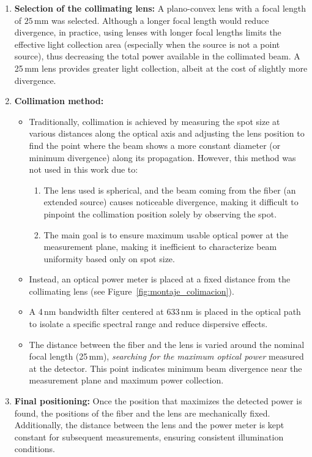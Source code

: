 \begin{enumerate}
    \item \textbf{Selection of the collimating lens:} A plano-convex lens with a focal length of $25$\,mm was selected. Although a longer focal length would reduce divergence, in practice, using lenses with longer focal lengths limits the effective light collection area (especially when the source is not a point source), thus decreasing the total power available in the collimated beam. A 25\,mm lens provides greater light collection, albeit at the cost of slightly more divergence.
    
    \item \textbf{Collimation method:}
    \begin{itemize}
        \item Traditionally, collimation is achieved by measuring the spot size at various distances along the optical axis and adjusting the lens position to find the point where the beam shows a more constant diameter (or minimum divergence) along its propagation. However, this method was not used in this work due to:
        \begin{enumerate}
            \item The lens used is spherical, and the beam coming from the fiber (an extended source) causes noticeable divergence, making it difficult to pinpoint the collimation position solely by observing the spot.
            \item The main goal is to ensure maximum usable optical power at the measurement plane, making it inefficient to characterize beam uniformity based only on spot size.
        \end{enumerate}
        
        \item Instead, an optical power meter is placed at a fixed distance from the collimating lens (see Figure~\ref{fig:montaje_colimacion}).
        \item A 4\,nm bandwidth filter centered at 633\,nm is placed in the optical path to isolate a specific spectral range and reduce dispersive effects.
        \item The distance between the fiber and the lens is varied around the nominal focal length (25\,mm), \emph{searching for the maximum optical power} measured at the detector. This point indicates minimum beam divergence near the measurement plane and maximum power collection.
    \end{itemize}
    
    \item \textbf{Final positioning:} Once the position that maximizes the detected power is found, the positions of the fiber and the lens are mechanically fixed. Additionally, the distance between the lens and the power meter is kept constant for subsequent measurements, ensuring consistent illumination conditions.
\end{enumerate}


